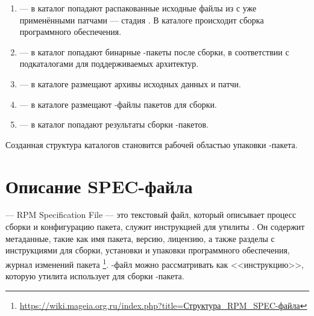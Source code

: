 
\begin{enumerate}
	\item {} --- в каталог попадают распакованные исходные файлы из
		 с уже применёнными патчами --- стадия .
		В каталоге  происходит сборка программного обеспечения.
	\item {} --- в каталог  попадают бинарные -пакеты после
		сборки, в соответствии с подкаталогами для поддерживаемых архитектур.
	\item {} --- в каталоге размещают архивы исходных данных и патчи.
	\item {} --- в каталоге размещают -файлы пакетов для сборки.
	\item {} --- в каталог  попадают результаты сборки -пакетов.
\end{enumerate}

Созданная структура каталогов становится рабочей областью упаковки -пакета.



\section{Описание SPEC-файла}
 --- RPM Specification File --- это текстовый файл, который описывает процесс сборки и конфигурацию
пакета, служит инструкцией для утилиты . Он содержит метаданные, такие как имя пакета, версию,
лицензию, а также разделы с инструкциями для сборки, установки и упаковки программного обеспечения, журнал
изменений пакета%
\footnote{\href{https://wiki.mageia.org.ru/index.php?title=\%D0\%A1\%D1\%82\%D1\%80\%D1\%83\%D0\%BA\%D1\%82\%D1\%83\%D1\%80\%D0\%B0_RPM_SPEC-\%D1\%84\%D0\%B0\%D0\%B9\%D0\%BB\%D0\%B0}%
{https://wiki.mageia.org.ru/index.php?title=Структура\_RPM\_SPEC-файла}}. %
-файл можно рассматривать как <<инструкцию>>, которую утилита  использует для сборки -пакета.

